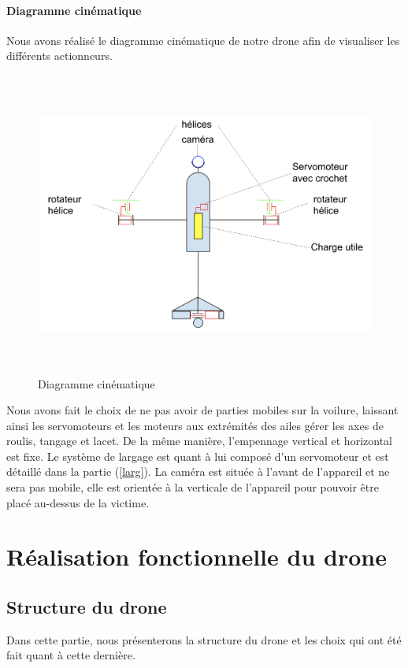\documentclass[a4paper,12pt,french]{report}
\begin{document}
\subsubsection{Diagramme cinématique}
Nous avons réalisé le diagramme cinématique de notre drone afin de visualiser les différents actionneurs.
\begin{figure}[h]
    \centering
    \includegraphics[height=10cm]{figures/cine.png}
    \caption{Diagramme cinématique}
    \label{cine}
\end{figure}

Nous avons fait le choix de ne pas avoir de parties mobiles sur la voilure, laissant ainsi les servomoteurs et les moteurs aux extrémités des ailes gérer les axes de roulis, tangage et lacet. De la même manière, l’empennage vertical et horizontal est fixe. Le système de largage est quant à lui composé d’un servomoteur et est détaillé dans la partie (\ref{larg}). La caméra est située à l’avant de l’appareil et ne sera pas mobile, elle est orientée à la verticale de l’appareil pour pouvoir être placé au-dessus de la victime.

\chapter{Réalisation fonctionnelle du drone}

\section{Structure du drone}

Dans cette partie, nous présenterons la structure du drone et les choix qui ont été fait quant à cette dernière.
\end{document}
